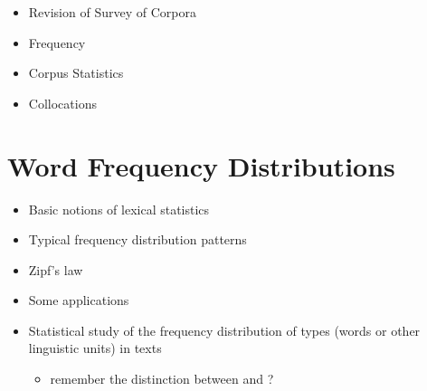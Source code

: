 \documentclass[a4paper,landscape,headrule,footrule,dvips]{foils}
\begin{document}
\begin{CJK}{UTF8}{min}

\maketitle



\begin{itemize} 
\item Revision  of Survey of Corpora
\item Frequency
\item Corpus Statistics
\item Collocations
\end{itemize}





\section{Word Frequency Distributions}



\begin{itemize}
\item Basic notions of lexical statistics
\item Typical frequency distribution patterns
\item Zipf’s law
\item Some applications
\end{itemize}


\begin{itemize}
\item Statistical study of the frequency distribution of types
(words or other linguistic units) in texts
\begin{itemize}
\item remember the distinction between  and ?
\end{itemize}


\end{itemize}
\end{CJK}
\end{document}
